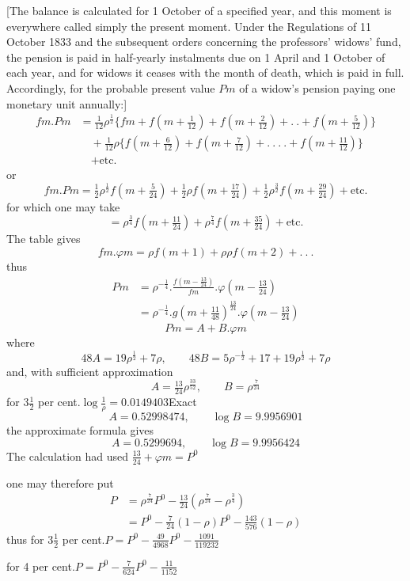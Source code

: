[The balance is calculated for 1 October of a specified year, and this moment is everywhere called simply the present moment. Under the Regulations of 11 October 1833 and the subsequent orders concerning the professors' widows' fund, the pension is paid in half-yearly instalments due on 1 April and 1 October of each year, and for widows it ceases with the month of death, which is paid in full. Accordingly, for the probable present value \(Pm\) of a widow's pension paying one monetary unit annually:]
\[
\begin{aligned}
fm\mathord{.}Pm&=\tfrac{1}{12}\rho^{\frac{1}{2}}\{fm+f(m+\tfrac{1}{12})+f(m+\tfrac{2}{12})+.\ .+f(m+\tfrac{5}{12})\}\\
&\quad+\tfrac{1}{12}\rho\{f(m+\tfrac{6}{12})+f(m+\tfrac{7}{12})+.\ .\ .\ .+f(m+\tfrac{11}{12})\}\\
&\quad+\text{etc.}
\end{aligned}
\]
\noindent or
\[
fm\mathord{.}Pm=\tfrac{1}{2}\rho^{\frac{1}{2}}f(m+\tfrac{5}{24})+\tfrac{1}{2}\rho f(m+\tfrac{17}{24})+\tfrac{1}{2}\rho^{\frac{3}{2}}f(m+\tfrac{29}{24})+\text{etc.}
\]
\noindent for which one may take
\[
=\rho^{\frac{3}{4}}f(m+\tfrac{11}{24})+\rho^{\frac{7}{4}}f(m+\tfrac{35}{24})+\text{etc.}
\]
\noindent The table gives
\[
fm\mathord{.}\varphi m=\rho f(m+1)+\rho\rho f(m+2)+.\ .\ .
\]
\noindent thus
\[
\begin{aligned}
Pm&=\rho^{-\frac{1}{4}}\mathord{.}\frac{f(m-\tfrac{13}{24})}{fm}\mathord{.}\varphi(m-\tfrac{13}{24})\\
&=\rho^{-\frac{1}{4}}\mathord{.}g(m+\tfrac{11}{48})^{\frac{13}{24}}\mathord{.}\varphi(m-\tfrac{13}{24})
\end{aligned}
\]
\[
Pm=A+B\mathord{.}\varphi m
\]
\noindent where
\[
48A=19\rho^{\frac{1}{2}}+7\rho,\qquad48B=5\rho^{-\frac{1}{2}}+17+19\rho^{\frac{1}{2}}+7\rho
\]
\noindent and, with sufficient approximation
\[
A=\tfrac{13}{24}\rho^{\frac{33}{52}},\qquad B=\rho^{\frac{7}{24}}
\]
\noindent for \(3\tfrac{1}{2}\) per cent.\quad \(\log\tfrac{1}{\rho}=0.0149403\)\quad Exact
\[
A=0.52998474,\qquad\log B=9.9956901
\]
\noindent the approximate formula gives
\[
A=0.5299694,\qquad\log B=9.9956424
\]
\noindent The calculation had used \(\tfrac{13}{24}+\varphi m=P^0\)\par
\noindent one may therefore put
\[
\begin{aligned}
P&=\rho^{\frac{7}{24}}P^0-\tfrac{13}{24}(\rho^{\frac{7}{24}}-\rho^{\frac{3}{4}})\\
&=P^0-\tfrac{7}{24}(1-\rho)P^0-\tfrac{143}{576}(1-\rho)
\end{aligned}
\]
\noindent thus for \(3\tfrac{1}{2}\) per cent.\quad \(P=P^0-\tfrac{49}{4968}P^0-\tfrac{1091}{119232}\)\par
\noindent for 4 per cent.\quad \(P=P^0-\tfrac{7}{624}P^0-\tfrac{11}{1152}\)

